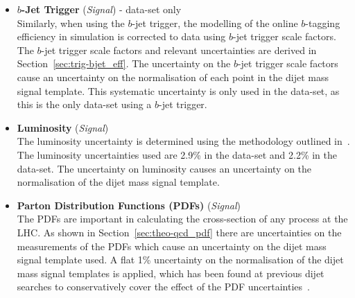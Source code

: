 \begin{itemize}[leftmargin=*]
\item\textbf{$b$-Jet Trigger} \hspace{1mm} (\textit{Signal}) - \lm{} data-set only\\
  Similarly, when using the $b$-jet trigger,
  the modelling of the online $b$-tagging efficiency in simulation is corrected to data using $b$-jet trigger scale factors.
  The $b$-jet trigger scale factors and relevant uncertainties are derived in Section~\ref{sec:trig-bjet_eff}.
  The uncertainty on the $b$-jet trigger scale factors cause an uncertainty on the normalisation of each point in the dijet mass signal template.
  This systematic uncertainty is only used in the \lm{} data-set, as this is the only data-set using a $b$-jet trigger.
  \vspace{0.5em}
\item\textbf{Luminosity} \hspace{1mm} (\textit{Signal})\\
  The luminosity uncertainty is determined using the methodology outlined in~\cite{lim-syst_lumi}.
  The luminosity uncertainties used are 2.9\% in the \summer{} data-set and 2.2\% in the \lm{} data-set.
  The uncertainty on luminosity causes an uncertainty on the normalisation of the dijet mass signal template.
  \vspace{0.5em}
\item\textbf{Parton Distribution Functions (PDFs) } \hspace{1mm}  (\textit{Signal})\\
  The PDFs are important in calculating the cross-section of any process at the LHC.
  As shown in Section~\ref{sec:theo-qcd_pdf} there are uncertainties on the measurements of the PDFs
  which cause an uncertainty on the dijet mass signal template used.
  A flat 1\% uncertainty on the normalisation of the dijet mass signal templates is applied,
  which has been found at previous dijet searches to conservatively cover
  the effect of the PDF uncertainties~\cite{dijet-mori16_paper,dijet-isr}.
  \vspace{0.5em}
\end{itemize}

